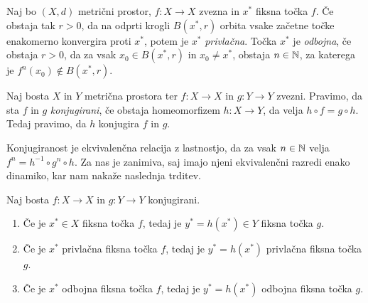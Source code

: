 \begin{definicija}
    Naj bo \((X, d)\) metrični prostor, \(f \colon X \to X\) zvezna in \(x^*\) fiksna točka \(f\). Če obstaja tak \(r > 0\), da na odprti krogli \(B (x^*, r)\) orbita vsake začetne točke enakomerno konvergira proti \(x^*\), potem je \(x^*\) \emph{privlačna}. Točka \(x^*\) je \emph{odbojna}, če obstaja \(r > 0\), da za vsak \(x_0 \in B (x^*, r)\) in \(x_0 \neq x^*\), obstaja \(n \in \mathbb N\), za katerega je \(f^n (x_0) \notin B (x^*, r)\).
\end{definicija}

\begin{definicija}
    Naj bosta \(X\) in \(Y\) metrična prostora ter \(f \colon X \to X\) in \(g \colon Y \to Y\) zvezni. Pravimo, da sta \(f\) in \(g\) \emph{konjugirani}, če obstaja homeomorfizem \(h \colon X \to Y\), da velja \(h \circ f = g \circ h\). Tedaj pravimo, da \(h\) konjugira \(f\) in \(g\).
\end{definicija}

Konjugiranost je ekvivalenčna relacija z lastnostjo, da za vsak \(n \in \mathbb N\) velja \(f^n = h^{-1} \circ g^n \circ h\). Za nas je zanimiva, saj imajo njeni ekvivalenčni razredi enako dinamiko, kar nam nakaže naslednja trditev.

\begin{trditev}
    Naj bosta \(f \colon X \to X\) in \(g \colon Y \to Y\) konjugirani.
    \begin{enumerate}
        \item Če je \(x^* \in X\) fiksna točka \(f\), tedaj je \(y^* = h (x^*) \in Y\) fiksna točka \(g\).
        \item Če je \(x^*\) privlačna fiksna točka \(f\), tedaj je \(y^* = h (x^*)\) privlačna fiksna točka \(g\).
        \item Če je \(x^*\) odbojna fiksna točka \(f\), tedaj je \(y^* = h (x^*)\) odbojna fiksna točka \(g\).
    \end{enumerate}
\end{trditev}

